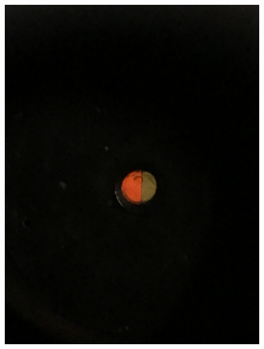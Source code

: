 \begin{figure}[h!]
\begin{minipage}{0.25\linewidth}
	\end{minipage}
	\begin{minipage}{0.25\linewidth}
		\includegraphics[width=\linewidth]{biquarz/orange-green.jpg}
	\end{minipage}
	\begin{minipage}{0.25\linewidth}

\end{minipage}
\end{figure}
